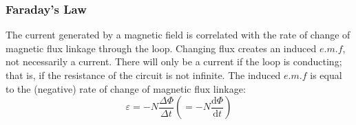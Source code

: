 \begin{center}
\end{center}
\subsubsection*{Faraday's Law}
The current generated by a magnetic field is correlated with the rate of change of magnetic flux linkage through the loop. Changing flux creates an induced $e.m.f$, not necessarily a current. There will only be a current if the loop is conducting; that is, if the resistance of the circuit is not infinite.
The induced $e.m.f$ is equal to the (negative) rate of change of magnetic flux linkage:
\[\varepsilon=-N\dfrac{\Delta \Phi}{\Delta t}\left(=-N\dfrac{\mathrm{d}\Phi}{\mathrm{d}t}\right)\]
